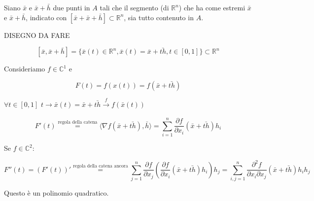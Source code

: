 \documentclass[../appunti-analisi.tex]{subfiles}
\begin{document}
Siano $\bar{x}$ e $\bar{x} +\bar{h} $ due punti in $A$ tali che il segmento (di $\mathbb{R}^{n}$) che ha come estremi $\bar{x} $ e $\bar{x} + \bar{h} $, indicato con $[\bar{x} +\bar{x} +\bar{h} ] \subset \mathbb{R}^{n}$, sia tutto contenuto in $A$.

DISEGNO DA FARE

       \[
           [\bar{x} , \bar{x} +\bar{h} ] = \{\bar{x} (t) \in \mathbb{R}^{n}, \bar{x} (t) = \bar{x} +\bar{th}, t \in [0,1]\} \subset \mathbb{R}^{n}
       \]

       Consideriamo $f \in \mathbb{C}^{1}$ e 

       \[
           F(t) = f(x(t)) = f(\bar{x} +\bar{th} ) 
       \]

       $\forall t \in [0,1]$ $t \rightarrow  \bar{x} (t) = \bar{x} + \bar{th} \xrightarrow[]{\text{$f$}}f(\bar{x} (t))$

       \[
           F'(t) \overset{\text{regola della catena}}{=} \langle \nabla f(\bar{x} +\bar{th} ),\bar{h}  \rangle = \sum^{n}_{i=1} \frac{\partial f}{\partial x_i} (\bar{x} +\bar{th} ) h_i
       \]

       Se $f \in  \mathbb{C}^{2}$:

       \[
           F''(t) = (F'(t))' \overset{\text{regola della catena ancora}}{=} \sum^{n}_{j=1} \frac{\partial f}{\partial x_j} ( \frac{\partial f}{\partial x_i}(\bar{x} +\bar{th} ) h_i) h_j = \sum^{n}_{i,j=1} \frac{\partial^{2} f}{\partial x_i \partial x_j} (\bar{x} + \bar{th} ) h_i h_j
       \]

       Questo è un polinomio quadratico.
\end{document}
